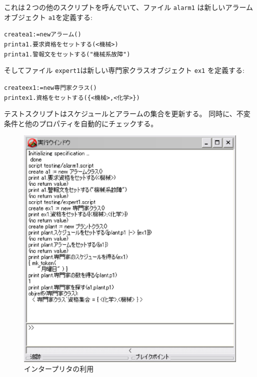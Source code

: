\documentclass[\pformat,12pt,twoside]{jarticle}
\begin{document}
これは２つの他のスクリプトを呼んでいて、ファイル \texttt{alarm1} は新しいアラームオブジェクト \texttt{a1}を定義する:

\small
\begin{alltt}
  create a1:= new アラーム()
  print a1.要求資格をセットする(\texttt{<}機械\texttt{>})
  print a1.警報文をセットする("機械系故障")

\end{alltt}
\normalsize

そしてファイル \texttt{expert1}は新しい専門家クラスオブジェクト \texttt{ex1} を定義する:

\small
\begin{alltt}
  create ex1:= new 専門家クラス()
  print ex1.資格をセットする(\{\texttt{<}機械\texttt{>},\texttt{<}化学\texttt{>}\})

\end{alltt}
\normalsize

テストスクリプトはスケジュールとアラームの集合を更新する。
同時に、不変条件と他のプロパティを自動的にチェックする。

\begin{figure}[ht]
\begin{center}
\includegraphics[width=5.546in]{firstscreendump}
\caption{インタープリタの利用 \label{fig:firstscreendump}}
\end{center}
\end{figure}
\end{document}
